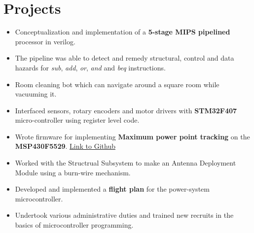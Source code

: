 \documentclass{resume}
\begin{document}
\section{Projects}
\begin{itemize}\setlength{\itemsep}{3pt}\setlength{\parskip}{0pt}
    \item Conceptualization and implementation of a \textbf{5-stage MIPS pipelined} processor in verilog.
    \item The pipeline was able to detect and remedy structural, control and data hazards for \emph{sub}, \emph{add}, \emph{or}, \emph{and} and \emph{beq} instructions.
\end{itemize}
\vspace{-0.1cm}
\begin{itemize}\setlength{\itemsep}{3pt}\setlength{\parskip}{0pt}
    \item Room cleaning bot which can navigate around a square room while vacuuming it.
    \item Interfaced sensors, rotary encoders and motor drivers with \textbf{STM32F407} micro-controller using register level code.
\end{itemize}
\vspace{-0.2cm}
\begin{itemize}\setlength{\itemsep}{3pt}\setlength{\parskip}{0pt}\vspace{0.1cm}
    \item Wrote firmware for implementing \textbf{Maximum power point tracking} on the \textbf{MSP430F5529}. {\href{https://github.com/parthkharade/MSP430F5529}{Link to Github}}
    \item Worked with the Structrual Subsystem to make an Antenna Deployment Module using a burn-wire mechanism.
    \item Developed and implemented a \textbf{flight plan} for the power-system microcontroller.
    \item Undertook various administrative duties and trained new recruits in the basics of microcontroller programming.
\end{itemize}
\end{document}
